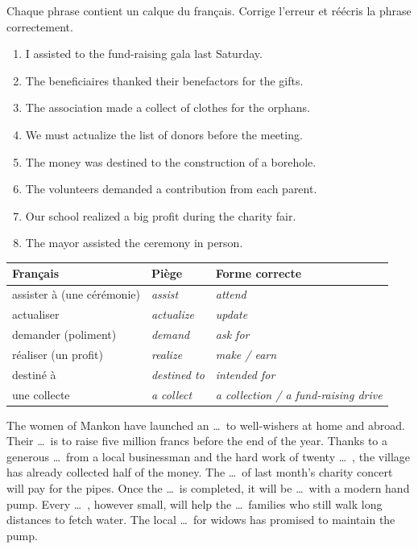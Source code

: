 \documentclass[11pt]{article}
\newcommand{\eng}[1]{\ifmmode\text{\textit{#1}}\else\begingroup\selectlanguage{english}\itshape #1\endgroup\fi}
\begin{document}
\begin{exercice}
Chaque phrase contient un calque du français. Corrige l'erreur et réécris la phrase correctement.

\begin{enumerate}
\item I assisted to the fund-raising gala last Saturday.
\item The beneficiaires thanked their benefactors for the gifts.
\item The association made a collect of clothes for the orphans.
\item We must actualize the list of donors before the meeting.
\item The money was destined to the construction of a borehole.
\item The volunteers demanded a contribution from each parent.
\item Our school realized a big profit during the charity fair.
\item The mayor assisted the ceremony in person.
\end{enumerate}
\end{exercice}

\begin{attention}
\begin{center}
\begin{tabularx}{\linewidth}{|X|X|X|}
\hline
\rowcolor{popblueL} Français & Piège & Forme correcte \\
\hline
assister à (une cérémonie) & \eng{assist} & \eng{attend} \\
\hline
actualiser & \eng{actualize} & \eng{update} \\
\hline
demander (poliment) & \eng{demand} & \eng{ask for} \\
\hline
réaliser (un profit) & \eng{realize} & \eng{make / earn} \\
\hline
destiné à & \eng{destined to} & \eng{intended for} \\
\hline
une collecte & \eng{a collect} & \eng{a collection / a fund-raising drive} \\
\hline
\end{tabularx}
\end{center}
\end{attention}

\begin{textebox}
The women of Mankon have launched an \ldots\ to well-wishers at home and abroad. Their \ldots\ is to raise five million francs before the end of the year. Thanks to a generous \ldots\ from a local businessman and the hard work of twenty \ldots\ , the village has already collected half of the money. The \ldots\ of last month's charity concert will pay for the pipes. Once the \ldots\ is completed, it will be \ldots\ with a modern hand pump. Every \ldots\ , however small, will help the \ldots\ families who still walk long distances to fetch water. The local \ldots\ for widows has promised to maintain the pump.
\end{textebox}
\end{document}
